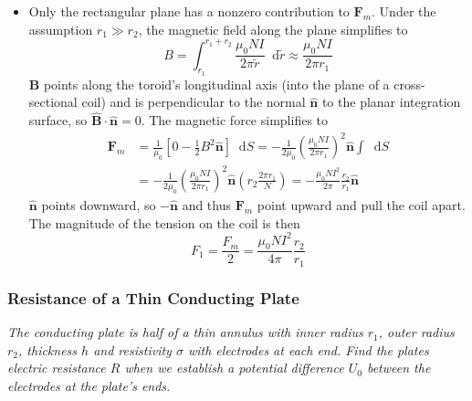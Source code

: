 \documentclass[11pt, a4paper]{article}
\newcommand{\diff}{\mathop{}\!\mathrm{d}} %
\renewcommand{\vec}[1]{\bm{#1}} %
\newcommand{\uvec}[1]{\hat{\vec{#1}}} %
\begin{document}
\begin{itemize}
	\item Only the rectangular plane has a nonzero contribution to $ \vec{F}_{m} $. Under the assumption $ r_{1} \gg r_{2} $, the magnetic field along the plane simplifies to
	\begin{equation*}
		B = \int_{r_{1}}^{r_{1} + r_{2}} \frac{\mu_{0}NI}{2\pi \tilde{r}} \diff \tilde{r} \approx \frac{\mu_{0}NI}{2\pi r_{1}}
	\end{equation*}
	$ \vec{B} $ points along the toroid's longitudinal axis (into the plane of a cross-sectional coil) and is perpendicular to the normal $ \uvec{n} $ to the planar integration surface, so $ \uvec{B} \cdot \uvec{n} = 0 $. The magnetic force simplifies to
	\begin{align*}
		\vec{F}_{m} &= \frac{1}{\mu_{0}}\left [0 - \frac{1}{2}B^{2}\uvec{n}\right ] \diff S = - \frac{1}{2\mu_{0}} \left(\frac{\mu_{0}NI}{2\pi r_{1}}\right)^{2} \uvec{n} \int \diff S \\
		&= - \frac{1}{2\mu_{0}} \left(\frac{\mu_{0}NI}{2\pi r_{1}}\right)^{2} \uvec{n} \left (r_{2} \frac{2\pi r_{1}}{N}\right ) = - \frac{\mu_{0}NI^{2}}{2\pi}\frac{r_{2}}{r_{1}} \uvec{n}
	\end{align*}
	$ \uvec{n} $ points downward, so $ -\uvec{n} $ and thus $ \vec{F}_{m} $ point upward and pull the coil apart. The magnitude of the tension on the coil is then
	\begin{equation*}
		F_{1} = \frac{F_{m}}{2} =  \frac{\mu_{0}NI^{2}}{4\pi}\frac{r_{2}}{r_{1}}
	\end{equation*}
	
\end{itemize}

\subsubsection{Resistance of a Thin Conducting Plate}
\textit{The conducting plate is half of a thin annulus with inner radius $ r_{1} $, outer radius $ r_{2} $, thickness $ h $ and resistivity $ \sigma $ with electrodes at each end.  Find the plates electric resistance $ R $ when we establish a potential difference $ U_{0}$ between the electrodes at the plate's ends.}
\end{document}
